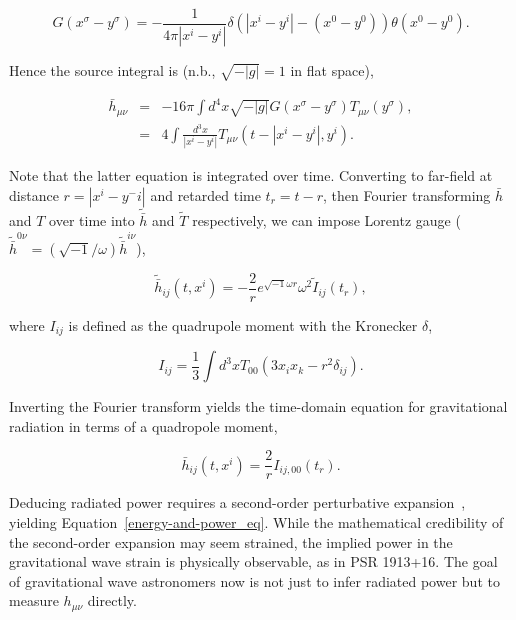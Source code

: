 \begin{equation}
G(x^\sigma - y^\sigma) = - \frac{1}{4\pi |x^i - y^i|}\delta \left(|x^i - y^i| - (x^0 - y^0)\right)\theta(x^0 - y^0).
\end{equation}

\noindent Hence the source integral is (n.b., $\sqrt{-|g|} = 1$ in flat space),

\begin{eqnarray}
\bar{h}_{\mu\nu} &=& -16\pi \int d^4 x \sqrt{-|g|} G(x^\sigma - y^\sigma) T_{\mu\nu}(y^\sigma),
\\
 &=& 4 \int \frac{d^3 x}{|x^i - y^i|} T_{\mu\nu} \left(t - |x^i - y^i|, y^i \right).
\end{eqnarray}

\noindent Note that the latter equation is integrated over time. 
Converting to far-field at distance $r = |x^i - y^-i|$ and retarded time $t_r = t - r$, then Fourier transforming $\bar{h}$ and $T$ over time into $\tilde{\bar{h}}$ and $\tilde{T}$ respectively, we can impose Lorentz gauge ($\tilde{\bar{h}}^{0\nu} = (\sqrt{-1}/\omega) \tilde{\bar{h}}^{i\nu}$),

\begin{equation} 
\tilde{\bar{h}}_{ij} (t,x^i) = -\frac{2}{r}e^{\sqrt{-1}\omega r}\omega^2 \tilde{I}_{ij}(t_r),
\label{Fourier-domain-quadpole-eq}
\end{equation}

\noindent where $I_{ij}$ is defined as the quadrupole moment with the Kronecker $\delta$, 

\begin{equation}
I_{ij} = \frac{1}{3}\int d^3 x T_{00} \left(3 x_i x_k - r^2 \delta_{ij}\right).
\end{equation}

\noindent Inverting the Fourier transform yields the time-domain equation for gravitational radiation in terms of a quadropole moment,

\begin{equation}
\bar{h}_{ij}(t, x^i) = \frac{2}{r} I_{ij,00} (t_r).
\end{equation}

Deducing radiated power requires a second-order perturbative expansion~\cite{Carroll1997,BallmerThesis}, yielding Equation~\ref{energy-and-power_eq}.
While the mathematical credibility of the second-order expansion may seem strained, the implied power in the gravitational wave strain is physically observable, as in PSR 1913+16.
The goal of gravitational wave astronomers now is not just to infer radiated power but to measure $h_{\mu\nu}$ directly.

